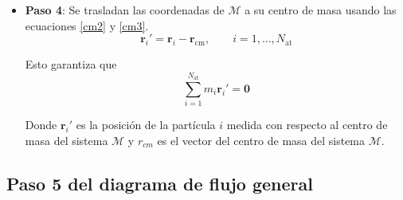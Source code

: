 \begin{itemize}
		
		\item \textbf{Paso 4}: Se trasladan las coordenadas de $\mathcal{M}$ a su centro de masa usando las ecuaciones \ref{cm2} y \ref{cm3}.
		\begin{equation}
			\mathbf{r}_i' = \mathbf{r}_i - \mathbf{r}_{\text{cm}}, \qquad
			i=1,\dots,N_{\text{at}}
			\label{cm2}
		\end{equation}
		
		Esto garantiza que
		\begin{equation}
			\sum_{i=1}^{N_{\text{at}}} m_i \mathbf{r}_i' = \mathbf{0}
			\label{cm3}
		\end{equation} 
		
		Donde $\mathbf{r}_i'$ es la posición de la partícula $i$ medida 
		con respecto al centro de masa del sistema $\mathcal{M}$ y 
		$r_{cm}$ es el vector del centro de masa del sistema $\mathcal{M}$.
		
		
	\end{itemize}


	\subsection{Paso 5 del diagrama de flujo general}
	
